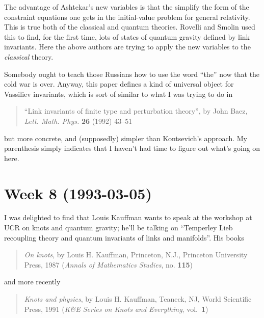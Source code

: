 \documentclass{article}
\def\tightlist{}
\renewcommand{\texttt}[1]{%
  \begingroup
  \ttfamily
  \begingroup\lccode`~=`/\lowercase{\endgroup\def~}{/\discretionary{}{}{}}%
  \begingroup\lccode`~=`[\lowercase{\endgroup\def~}{[\discretionary{}{}{}}%
  \begingroup\lccode`~=`.\lowercase{\endgroup\def~}{.\discretionary{}{}{}}%
  \catcode`/=\active\catcode`[=\active\catcode`.=\active
  \scantokens{#1\noexpand}%
  \endgroup
}
\begin{document}
The advantage of Ashtekar's new variables is that the simplify the form
of the constraint equations one gets in the initial-value problem for
general relativity. This is true both of the classical and quantum
theories. Rovelli and Smolin used this to find, for the first time, lots
of states of quantum gravity defined by link invariants. Here the above
authors are trying to apply the new variables to the \emph{classical}
theory.


Somebody ought to teach those Russians how to use the word ``the'' now
that the cold war is over. Anyway, this paper defines a kind of
universal object for Vassiliev invariants, which is sort of similar to
what I was trying to do in

\begin{quote}
``Link invariants of finite type and perturbation theory'', by John
Baez, \emph{Lett. Math. Phys.} \textbf{26} (1992) 43--51
\end{quote}

but more concrete, and (supposedly) simpler than Kontsevich's approach.
My parenthesis simply indicates that I haven't had time to figure out
what's going on here.
\hypertarget{week8}{%
\section{Week 8 (1993-03-05)}\label{week8}}

I was delighted to find that Louis Kauffman wants to speak at the
workshop at UCR on knots and quantum gravity; he'll be talking on
``Temperley Lieb recoupling theory and quantum invariants of links and
manifolds''. His books

\begin{quote}
\emph{On knots}, by Louis H. Kauffman, Princeton, N.J., Princeton
University Press, 1987 (\emph{Annals of Mathematics Studies}, no.
\textbf{115})
\end{quote}

and more recently

\begin{quote}
\emph{Knots and physics}, by Louis H. Kauffman, Teaneck, NJ, World
Scientific Press, 1991 (\emph{K\&E Series on Knots and Everything},
vol.~\textbf{1})
\end{quote}
\end{document}
